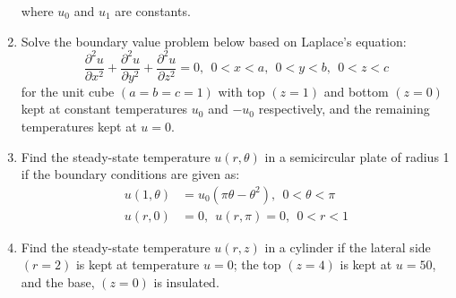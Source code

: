 \begin{fullwidth}
\begin{enumerate}
\noindent where $u_0$ and $u_1$ are constants.


\vspace{1.0cm}

\item Solve the boundary value problem below based on Laplace's equation:
\begin{equation*}
\frac{\partial^2 u}{\partial x^2} + \frac{\partial^2 u}{\partial y^2} + \frac{\partial^2 u}{\partial z^2} = 0, \ \ 0<x<a, \ \ 0 < y<b, \ \ 0 < z < c 
\end{equation*}
for the unit cube $(a = b = c = 1)$ with top $(z=1)$ and bottom $(z = 0)$ kept at constant temperatures $u_0$ and $-u_0$ respectively, and the remaining temperatures kept at $u=0$.

\vspace{2.0cm}

\item Find the steady-state temperature $u(r,\theta)$ in a semicircular plate of radius 1 if the boundary conditions are given as:
\begin{align*}
u(1,\theta) &= u_0(\pi \theta - \theta^2), \  \ 0 < \theta < \pi \\
u(r,0) &= 0, \ \ u(r,\pi) = 0, \ \ 0 < r < 1
\end{align*}

\vspace{2.0cm}

\item Find the steady-state temperature $u(r,z)$ in a cylinder if the lateral side $(r=2)$ is kept at temperature $u=0$; the top $(z=4)$ is kept at $u=50$, and the base, $(z=0)$ is insulated.

\end{enumerate}


\end{fullwidth}

